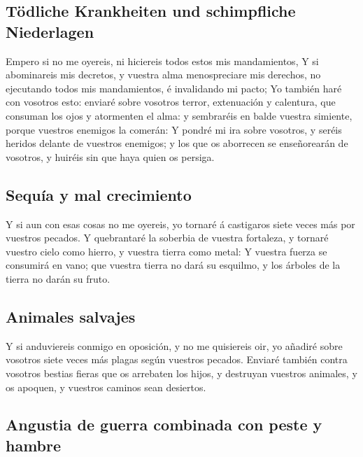 \hypertarget{tuxf6dliche-krankheiten-und-schimpfliche-niederlagen}{%
\subsection{Tödliche Krankheiten und schimpfliche
Niederlagen}\label{tuxf6dliche-krankheiten-und-schimpfliche-niederlagen}}

 Empero si no me oyereis, ni hiciereis todos estos mis
mandamientos,  Y si abominareis mis decretos, y vuestra
alma menospreciare mis derechos, no ejecutando todos mis mandamientos, é
invalidando mi pacto;  Yo también haré con vosotros esto:
enviaré sobre vosotros terror, extenuación y calentura, que consuman los
ojos y atormenten el alma: y sembraréis en balde vuestra simiente,
porque vuestros enemigos la comerán:  Y pondré mi ira sobre
vosotros, y seréis heridos delante de vuestros enemigos; y los que os
aborrecen se enseñorearán de vosotros, y huiréis sin que haya quien os
persiga.

\hypertarget{sequuxeda-y-mal-crecimiento}{%
\subsection{Sequía y mal
crecimiento}\label{sequuxeda-y-mal-crecimiento}}

 Y si aun con esas cosas no me oyereis, yo tornaré á
castigaros siete veces más por vuestros pecados.  Y
quebrantaré la soberbia de vuestra fortaleza, y tornaré vuestro cielo
como hierro, y vuestra tierra como metal:  Y vuestra fuerza
se consumirá en vano; que vuestra tierra no dará su esquilmo, y los
árboles de la tierra no darán su fruto.

\hypertarget{animales-salvajes}{%
\subsection{Animales salvajes}\label{animales-salvajes}}

 Y si anduviereis conmigo en oposición, y no me quisiereis
oir, yo añadiré sobre vosotros siete veces más plagas según vuestros
pecados.  Enviaré también contra vosotros bestias fieras
que os arrebaten los hijos, y destruyan vuestros animales, y os apoquen,
y vuestros caminos sean desiertos.

\hypertarget{angustia-de-guerra-combinada-con-peste-y-hambre}{%
\subsection{Angustia de guerra combinada con peste y
hambre}\label{angustia-de-guerra-combinada-con-peste-y-hambre}}

